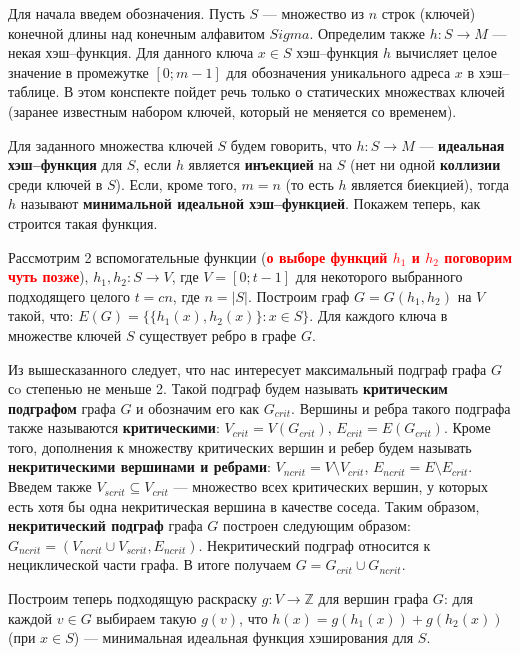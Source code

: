 \documentclass[specialist,
               substylefile = spbu.rtx,
               subf,href,colorlinks=true, 12pt]{disser}
\begin{document}
Для начала введем обозначения. Пусть $S$ --- множество из $n$ строк (ключей) конечной длины над конечным алфавитом $Sigma$.
Определим также $h: S \longrightarrow M$ ---  некая хэш--функция. Для данного ключа $x \in S$ хэш--функция $h$ вычисляет целое значение в промежутке $[0;m-1]$ для обозначения уникального адреса  $x$ в хэш--таблице. В этом конспекте пойдет речь только о статических множествах ключей (заранее известным набором ключей, который не меняется со временем). 

Для заданного множества ключей $S$ будем говорить, что $h: S \longrightarrow M$ --- \textbf{идеальная хэш--функция} для $S$, если $h$ является \textbf{инъекцией} на $S$ (нет ни одной \textbf{коллизии} среди ключей в $S$). Если, кроме того, $m = n$ (то есть $h$ является биекцией), тогда $h$ называют \textbf{минимальной идеальной хэш--функцией}. Покажем теперь, как строится такая функция.

Рассмотрим 2 вспомогательные функции (\textcolor{red}{\textbf{о выборе функций $h_1$ и $h_2$ поговорим чуть позже}}), $h_1, h_2 : S \longrightarrow V$, где $V = [0; t-1]$ для некоторого выбранного подходящего целого $t = cn$, где $n = |S|$. Построим граф $G = G(h_1, h_2)$ на $V$ такой, что: $E(G) = \{\{h_1(x),h_2(x)\}: x \in S\}$. Для каждого ключа в множестве ключей $S$ существует ребро в графе $G$.

Из вышесказанного следует, что нас интересует максимальный подграф графа $G$ сo степенью не меньше 2. Такой подграф будем называть \textbf{критическим подграфом} графа $G$ и обозначим его как $G_{crit}$. Вершины и ребра такого подграфа также называются \textbf{критическими}: $V_{crit} = V(G_{crit})$, $E_{crit} = E(G_{crit})$. Кроме того, дополнения к множеству критических вершин и ребер будем называть \textbf{некритическими вершинами и ребрами}: $V_{ncrit} = V \setminus V_{crit}$, $E_{ncrit} = E \setminus E_{crit}$. Введем также $V_{scrit} \subseteq V_{crit}$ --- множество всех критических вершин, у которых есть хотя бы одна некритическая вершина в качестве соседа. Таким образом, \textbf{некритический подграф} графа $G$ построен следующим образом: $G_{ncrit} = (V_{ncrit} \cup V_{scrit}, E_{ncrit})$. Некритический подграф относится к нециклической части графа. В итоге получаем $G = G_{crit} \cup G_{ncrit}$.

Построим теперь подходящую раскраску $g : V \longrightarrow \mathbb{Z}$ для вершин графа $G$: для каждой $v \in G$ выбираем такую $g(v)$, что $h(x) = g(h_1(x)) + g(h_2(x))$ (при $x \in S$) --- минимальная идеальная функция хэширования для $S$.
\end{document}
